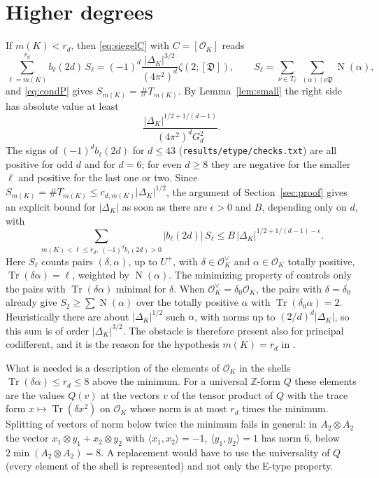 \documentclass[11pt]{amsart}
\theoremstyle{definition}
\numberwithin{equation}{section}
\DeclareMathOperator{\Tr}{Tr}
\DeclareMathOperator{\N}{N}
\newcommand{\OK}{\mathcal{O}_K}
\newcommand{\OKd}{\mathcal{O}_K^{\vee}}
\newcommand{\Dif}{\mathfrak{D}}
\newcommand{\Z}{\mathbb{Z}}
\newcommand{\file}[1]{\texttt{#1}}
\begin{document}
\section{Higher degrees}\label{sec:higher}

If $m(K)<r_d$, then \eqref{eq:siegelC} with $C=[\OK]$ reads
\begin{equation}\label{eq:general}
  \sum_{\ell=m(K)}^{r_d}b_\ell(2d)\,S_\ell=(-1)^d\frac{|\Delta_K|^{3/2}}{(4\pi^2)^d}\zeta(2;[\Dif]),
  \qquad S_\ell=\sum_{\nu\in T_\ell}\ \sum_{(\alpha)\mid\nu\Dif}\N(\alpha),
\end{equation}
and \eqref{eq:condP} gives $S_{m(K)}=\#T_{m(K)}$.  By Lemma~\ref{lem:small} the right side has
absolute value at least
\[
  \frac{|\Delta_K|^{1/2+1/(d-1)}}{(4\pi^2)^dG_d^2}.
\]
The signs of $(-1)^db_\ell(2d)$
for $d\le43$ (\file{results/etype/checks.txt}) are all positive for odd $d$ and for $d=6$; for even
$d\ge8$ they are negative for the smaller $\ell$ and positive for the last one or two.  Since
$S_{m(K)}=\#T_{m(K)}\le c_{d,m(K)}|\Delta_K|^{1/2}$, the argument of Section~\ref{sec:proof} gives an
explicit bound for $|\Delta_K|$ as soon as there are $\epsilon>0$ and $B$, depending only on $d$, with
\[
  \sum_{m(K)<\ell\le r_d,\ (-1)^db_\ell(2d)>0}|b_\ell(2d)|\,S_\ell\le B\,|\Delta_K|^{1/2+1/(d-1)-\epsilon}.
\]
Here $S_\ell$ counts pairs $(\delta,\alpha)$, up to $U^+$, with $\delta\in\OKd$ and $\alpha\in\OK$
totally positive, $\Tr(\delta\alpha)=\ell$, weighted by $\N(\alpha)$.  The minimizing property of
\cite[Lemma~4.6]{KY1} controls only the pairs with $\Tr(\delta\alpha)$ minimal for $\delta$.  When
$\OKd=\delta_0\OK$, the pairs with $\delta=\delta_0$ already give $S_2\ge\sum\N(\alpha)$ over the
totally positive $\alpha$ with $\Tr(\delta_0\alpha)=2$.  Heuristically there are about
$|\Delta_K|^{1/2}$ such $\alpha$, with norms up to $(2/d)^d|\Delta_K|$, so this sum is of order
$|\Delta_K|^{3/2}$.  The obstacle is therefore present also for principal codifferent, and it is the
reason for the hypothesis $m(K)=r_d$ in \cite[Theorem~2.4]{KM}.

What is needed is a description of the elements of $\OK$ in the shells
$\Tr(\delta\alpha)\le r_d\le8$ above the minimum.  For a universal $\Z$-form $Q$ these elements are
the values $Q(v)$ at the vectors $v$ of the tensor product of $Q$ with the trace form
$x\mapsto\Tr(\delta x^2)$ on $\OK$ whose norm is at most $r_d$ times the minimum.  Splitting of vectors of norm below twice
the minimum fails in general: in $A_2\otimes A_2$ the vector $x_1\otimes y_1+x_2\otimes y_2$ with
$\langle x_1,x_2\rangle=-1$, $\langle y_1,y_2\rangle=1$ has norm $6$, below $2\min(A_2\otimes A_2)=8$.
A replacement would have to use the universality of $Q$ (every element of the shell is represented)
and not only the E-type property.
\end{document}
